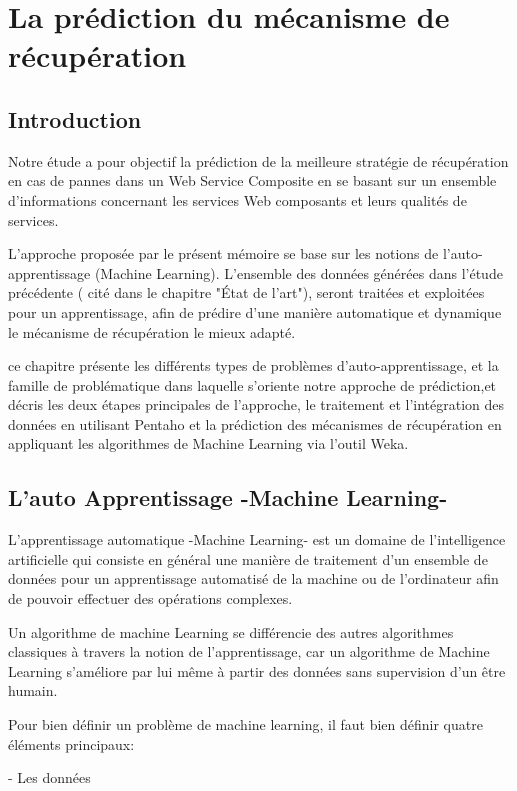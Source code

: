 \chapter{La prédiction du mécanisme de récupération}

\section{Introduction}
Notre étude a pour objectif la prédiction de la meilleure stratégie de récupération en cas de pannes dans un Web Service Composite en se basant sur un ensemble d'informations concernant les services Web composants et leurs qualités de services.

L'approche proposée par le présent mémoire se base sur les notions de l'auto-apprentissage (Machine Learning). L'ensemble des données générées dans l'étude précédente ( cité dans le chapitre "État de l'art"), seront traitées et exploitées pour un apprentissage, afin de prédire d'une manière automatique et dynamique le mécanisme de récupération le mieux adapté.

ce chapitre présente les différents types de problèmes d'auto-apprentissage, et la famille de problématique dans laquelle s'oriente notre approche de prédiction,et décris les deux étapes principales de l'approche, le traitement et l'intégration des données en utilisant Pentaho et la prédiction des mécanismes de récupération en appliquant les algorithmes de Machine Learning via l'outil Weka. 


\section{L'auto Apprentissage -Machine Learning- }

L'apprentissage automatique -Machine Learning- est un domaine de l'intelligence artificielle qui consiste en général une manière de traitement d'un ensemble de données pour un apprentissage automatisé de la machine ou de l'ordinateur afin de pouvoir effectuer des opérations complexes.

Un algorithme de machine Learning se différencie des autres algorithmes classiques à travers la notion de l'apprentissage, car un algorithme de Machine Learning s'améliore par lui même à partir des données sans supervision d'un être humain.

Pour bien définir un problème de machine learning, il faut bien définir quatre éléments principaux: 

- Les données

